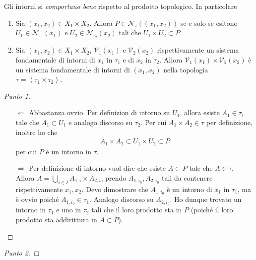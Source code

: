 \begin{theorem}
	Gli intorni si \emph{comportano bene} rispetto al prodotto topologico. In particolare
	\begin{enumerate}
		\item Sia $(x_1, x_2) \in X_1\times X_2$. Allora $P \in \mathcal{N}_\tau((x_1,x_2))$ se e solo se esitono $U_1 \in \mathcal{N}_{\tau_1}(x_1)$ e $U_2 \in \mathcal{N}_{\tau_2}(x_2)$ tali che $U_1\times U_2 \subset P$.
		\item Sia $(x_1, x_2) \in X_1\times X_2$, $\mathcal{V}_1(x_1)$ e $\mathcal{V}_2(x_2)$ rispettivamente un sistema fondamentale di intorni di $x_1$ in $\tau_1$ e di $x_2$ in $\tau_2$. Allora $\mathcal{V}_1(x_1) \times \mathcal{V}_2(x_2)$ è un sistema fondamentale di intorni di $(x_1, x_2)$ nella topologia $\tau = \left\langle \tau_1 \times \tau_2 \right\rangle$.
	\end{enumerate}	
\end{theorem}
\begin{proof}[Punto 1]
	\begin{enumerate}
		\item[$\Leftarrow$] Abbastanza ovvio. Per definizion di intorno su $U_1$, allora esiste $A_1 \in \tau_1$ tale che $A_1 \subset U_1$ e analogo discorso su $\tau_2$. Per cui $A_1 \times A_2 \in \tau$ per definizione, inoltre ho che 
		\begin{equation}
		\begin{aligned}
			A_1 \times A_2 \subset U_1 \times U_2 \subset P
		\end{aligned}
		\end{equation}
		per cui $P$ è un intorno in $\tau$.
		\item[$\Rightarrow$] Per definizione di intorno vuol dire che esiste $A \subset P$ tale che $A \in \tau$. Allora $A = \bigcup_{i \in I} A_{1,i} \times A_{2,i}$, prendo $A_{1,i_0}, A_{2,i_0}$ tali da contenere rispettivamente $x_1, x_2$. Devo dimostrare che $A_{1,i_0}$ è un intorno di $x_1$ in $\tau_1$, ma è ovvio poiché $A_{1,i_0} \in \tau_1$. Analogo discorso su $A_{2,i_0}$. Ho dunque trovato un intorno in $\tau_1$ e uno in $\tau_2$ tali che il loro prodotto sta in $P$ (poiché il loro prodotto sta addirittura in $A \subset P$).
	\end{enumerate}
\end{proof}
\begin{proof}[Punto 2]
\end{proof}

